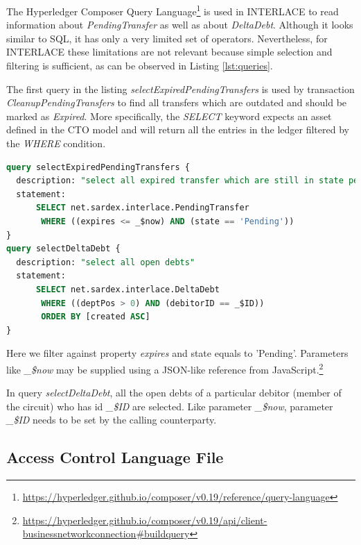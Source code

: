 The Hyperledger Composer Query Language\footnote{\url{https://hyperledger.github.io/composer/v0.19/reference/query-language}} is used in INTERLACE to read information about \textit{PendingTransfer} as well as about \textit{DeltaDebt}. Although it looks similar to SQL, it has only a very limited set of operators. Nevertheless, for INTERLACE these limitations are not relevant because simple selection and filtering is sufficient, as can be observed in Listing \ref{lst:queries}.

The first query in the listing \textit{selectExpiredPendingTransfers} is used by transaction \textit{CleanupPendingTransfers} to find all transfers which are outdated and should be marked as \textit{Expired}. More specifically, the \textit{SELECT} keyword expects an asset defined in the CTO model and will return all the entries in the ledger filtered by the \textit{WHERE} condition.

\begin{center}
\begin{minipage}{0.8\textwidth}
\small
\begin{lstlisting}[language=sql,firstnumber=1,caption={\bf\small INTERLACE business network queries}, captionpos=b,label=lst:queries]
query selectExpiredPendingTransfers {
  description: "select all expired transfer which are still in state pending"
  statement:
      SELECT net.sardex.interlace.PendingTransfer
       WHERE ((expires <= _$now) AND (state == 'Pending'))
}
query selectDeltaDebt {
  description: "select all open debts"
  statement:
      SELECT net.sardex.interlace.DeltaDebt
       WHERE ((deptPos > 0) AND (debitorID == _$ID))
       ORDER BY [created ASC]
}
\end{lstlisting}
\end{minipage}
\end{center}

Here we filter against property \textit{expires} and state equals to 'Pending'. Parameters like \textit{\_\$now} may be supplied using a JSON-like reference from JavaScript.\footnote{\url{https://hyperledger.github.io/composer/v0.19/api/client-businessnetworkconnection\#buildquery}}

In query \textit{selectDeltaDebt}, all the open debts of a particular debitor (member of the circuit) who has id \textit{\_\$ID} are selected. Like parameter \textit{\_\$now}, parameter \textit{\_\$ID} needs to be set by the calling counterparty.

\subsection{Access Control Language File}

